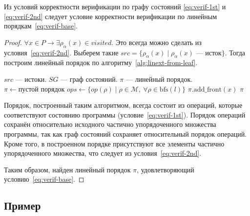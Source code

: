 \begin{lemma}
  Из условий корректности верификации по графу состояний
  \ref{eq:verif-1st} и \ref{eq:verif-2nd} следует условие
  корректности верификации по линейным порядкам~\ref{eq:verif-base}.
  \label{lm:verif-equals}
\end{lemma}

\begin{proof}
  $\forall x \in P \rightarrow \exists \rho_{\alpha}(x) \in visited$.
  Это всегда можно сделать из условия~\ref{eq:verif-2nd}. Выберем
  такие $src = \{\rho_{\alpha}(x) \mid \rho_{\alpha}(x) \text{ —
  исток}\}$. Тогда построим линейный порядок по
  алгоритму~\ref{alg:linext-from-leaf}.

  \begin{algorithm}[H]
    \caption{Построение линейного порядка из множества истоков графа состояний}
    \label{alg:linext-from-leaf}
    \begin{algorithmic}[1]
      \Require $src$ — истоки.
      \Require $SG$ — граф состояний.
      \Ensure $\pi$ — линейный порядок.
      \State $\pi \gets \text{пустой порядок}$
      \State $ops \gets \{op(\rho) \mid \rho \in
      \mathcal{M},\ \forall \rho \in \text{bfs}(l)\}$
      \State $\pi.\text{add\_front}(x)$
      \EndFor
      \EndFor
      \State \Return $\pi$
      \EndFunction
    \end{algorithmic}
  \end{algorithm}

  Порядок, построенный таким алгоритмом,
  всегда состоит из операций, которые соответствуют состоянию
  программы (условие~\ref{eq:verif-1st}). Порядок операций сохранён
  относительно исходного частично упорядоченного множества программы,
  так как граф состояний сохраняет относительный порядок операций.
  Кроме того, в построенном порядке присутствуют все элементы
  частично упорядоченного множества, что следует из условия~\ref{eq:verif-2nd}.

  Таким образом, найден линейный порядок $\pi$, удовлетворяющий
  условию~\ref{eq:verif-base}.
\end{proof}

\subsection{Пример}
\label{sec:ch4/example}

